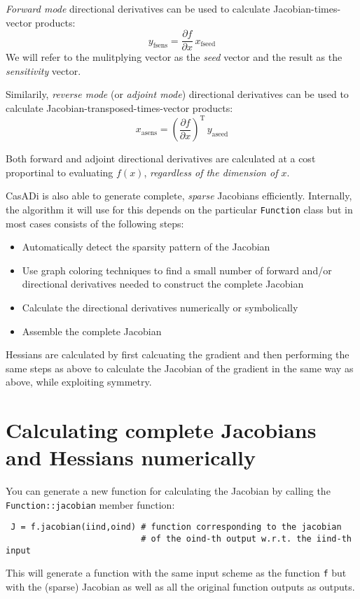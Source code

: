\documentclass[a4paper,12pt]{book}
\begin{document}
\emph{Forward mode} directional derivatives can be used to calculate Jacobian-times-vector products:
\begin{equation}
 y_{\text{fsens}} = \frac{\partial f}{\partial x} \, x_{\text{fseed}}
\end{equation}
We will refer to the mulitplying vector as the \emph{seed} vector and the result as the \emph{sensitivity} vector.

Similarily, \emph{reverse mode} (or \emph{adjoint mode}) directional derivatives can be used to calculate Jacobian-transposed-times-vector products:
\begin{equation}
 x_{\text{asens}} = \left(\frac{\partial f}{\partial x}\right)^{\text{T}} \, y_{\text{aseed}}
\end{equation}

Both forward and adjoint directional derivatives are calculated at a cost proportinal to evaluating $f(x)$, \emph{regardless of the dimension of $x$}.

CasADi is also able to generate complete, \emph{sparse} Jacobians efficiently. Internally, the algorithm it will use for this depends on the particular \texttt{Function} class but in most cases consists of the following steps:
\begin{itemize}
 \item Automatically detect the sparsity pattern of the Jacobian
 \item Use graph coloring techniques to find a small number of forward and/or directional derivatives needed to construct the complete Jacobian
 \item Calculate the directional derivatives numerically or symbolically
 \item Assemble the complete Jacobian
\end{itemize}

Hessians are calculated by first calcuating the gradient and then performing the same steps as above to calculate the Jacobian of the gradient in the same way as above, while exploiting symmetry.


\section{Calculating complete Jacobians and Hessians numerically}
You can generate a new function for calculating the Jacobian by calling the \texttt{Function::jacobian} member function:
\begin{verbatim}
 J = f.jacobian(iind,oind) # function corresponding to the jacobian
                           # of the oind-th output w.r.t. the iind-th input
\end{verbatim}
This will generate a function with the same input scheme as the function \texttt{f} but with the (sparse) Jacobian as well as all the original function outputs as outputs.
\end{document}
